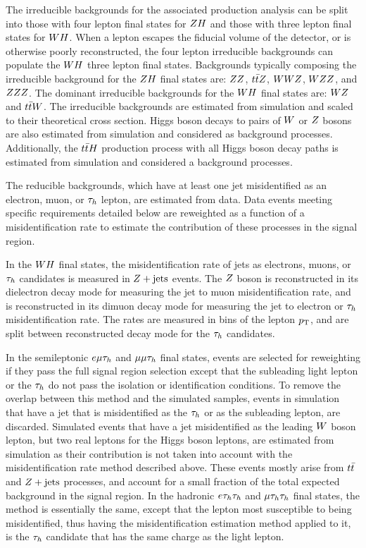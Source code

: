 The irreducible backgrounds for the associated production analysis can
be split into those with four lepton final states for $ZH$ and those
with three lepton final states for $WH$. When a lepton escapes the fiducial
volume of the detector, or is otherwise poorly reconstructed, the four
lepton irreducible backgrounds can populate the $WH$ three
lepton final states.
Backgrounds typically composing
the irreducible background for the $ZH$ final states are: $ZZ$, 
$t\bar{t}Z$, $WWZ$, $WZZ$, and $ZZZ$. The dominant
irreducible backgrounds for the $WH$ final states are:
$WZ$ and $t\bar{t}W$. The irreducible backgrounds are 
estimated from simulation and scaled to their theoretical cross section. Higgs 
boson decays to pairs of $W$ or $Z$ bosons 
are also estimated from simulation and considered as background processes. 
Additionally, the $t\bar{t}H$ production process with all Higgs boson decay
paths is estimated from simulation and considered a background processes.

The reducible backgrounds, which have at least one jet misidentified as an electron, 
muon, or $\tau_{h}$ lepton, are estimated from data. 
Data events meeting specific requirements detailed below are reweighted 
as a function of a misidentification rate to estimate the 
contribution of these processes in the signal region. 

In the $WH$ final states, the misidentification rate of jets as electrons, muons, 
or $\tau_{h}$ candidates is measured in $Z+\textrm{jets}$ events. The $Z$ boson is reconstructed 
in its dielectron decay mode for measuring the jet to muon misidentification
rate, and is reconstructed in its dimuon decay mode for measuring the jet to electron
or $\tau_{h}$ misidentification rate.
The rates are measured in bins of the lepton $p_\mathrm{T}$, and are 
split between reconstructed decay mode for the $\tau_{h}$ candidates. 

In the semileptonic $e\mu\tau_{h}$ and $\mu\mu\tau_{h}$ final states, 
events are selected for reweighting if they pass the full signal region 
selection except that the subleading light lepton or the $\tau_{h}$ do not 
pass the isolation or identification conditions.
To remove the overlap between this method and the simulated samples, events in simulation that have a jet that is 
misidentified as the $\tau_{h}$ or as the subleading lepton, are discarded. Simulated 
events that have a jet misidentified as the leading $W$ boson lepton, but two real leptons 
for the Higgs boson leptons, are estimated from simulation as their 
contribution is not taken into account with the misidentification rate method 
described above. These events mostly arise from $t\bar{t}$ and $Z+\textrm{jets}$ processes, 
and account for a small fraction of the total expected background in the signal region. 
In the hadronic $e\tau_{h}\tau_{h}$ and $\mu\tau_{h}\tau_{h}$ final states, 
the method is essentially the same, except that the lepton most susceptible to being misidentified,
thus having the misidentification estimation method applied to it, 
is the $\tau_{h}$ candidate that has the same charge as the light lepton.  

